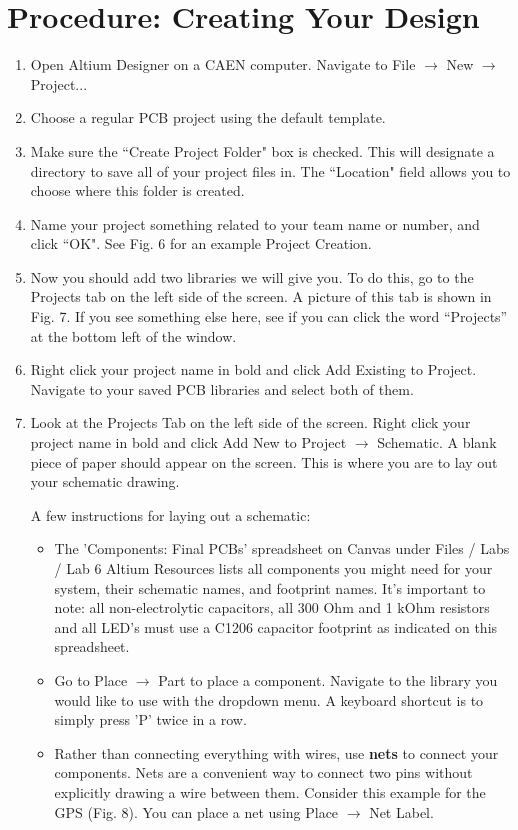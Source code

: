 \documentclass[12pt]{article}
\begin{document}
\section*{Procedure: Creating Your Design}
    \begin{enumerate}
    \item Open Altium Designer on a CAEN computer. Navigate to File $\rightarrow$ New $\rightarrow$ Project...
    \item Choose a regular PCB project using the default template. 
    \item Make sure the ``Create Project Folder" box is checked. This will designate a directory to save all of your project files in. The ``Location" field allows you to choose where this folder is created.
    \item Name your project something related to your team name or number, and click ``OK". See Fig. 6 for an example Project Creation.
    
    \item Now you should add two libraries we will give you. To do this, go to the Projects tab on the left side of the screen. A picture of this tab is shown in Fig. 7. If you see something else here, see if you can click the word ``Projects'' at the bottom left of the window.
    
    \item Right click your project name in bold and click Add Existing to Project. Navigate to your saved PCB libraries and select both of them.
    
    \item Look at the Projects Tab on the left side of the screen. Right click your project name in bold and click Add New to Project $\rightarrow$ Schematic. A blank piece of paper should appear on the screen. This is where you are to lay out your schematic drawing.
    
    A few instructions for laying out a schematic:
    \begin{itemize}
    \item  The 'Components: Final PCBs' spreadsheet on Canvas under Files / Labs / Lab 6 Altium Resources lists all components you might need for your system, their schematic names, and footprint names. It's important to note: all non-electrolytic capacitors, all 300 Ohm and 1 kOhm resistors and all LED's must use a C1206 capacitor footprint as indicated on this spreadsheet. 
    \item Go to Place $\rightarrow$ Part to place a component. Navigate to the library you would like to use with the dropdown menu. A keyboard shortcut is to simply press 'P' twice in a row.
    \item Rather than connecting everything with wires, use \textbf{nets} to connect your components. Nets are a convenient way to connect two pins without explicitly drawing a wire between them. Consider this example for the GPS (Fig. 8). You can place a net using Place $\rightarrow$ Net Label.
    

\end{itemize}
\end{enumerate}
\end{document}
